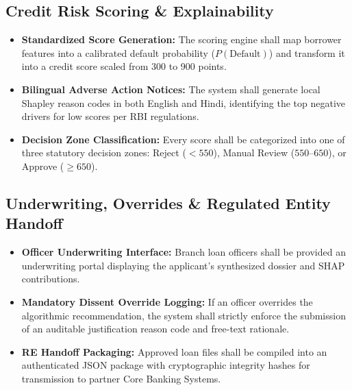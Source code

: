 \subsection{Credit Risk Scoring \& Explainability}
\begin{itemize}[leftmargin=2em, label=\textbf{FR-\arabic*.}]
  \setcounter{enumi}{6}
  \item \textbf{Standardized Score Generation:} The scoring engine shall map borrower features into a calibrated default probability ($P(\text{Default})$) and transform it into a credit score scaled from 300 to 900 points.
  \item \textbf{Bilingual Adverse Action Notices:} The system shall generate local Shapley reason codes in both English and Hindi, identifying the top negative drivers for low scores per RBI regulations.
  \item \textbf{Decision Zone Classification:} Every score shall be categorized into one of three statutory decision zones: Reject ($<550$), Manual Review ($550\text{--}650$), or Approve ($\ge 650$).
\end{itemize}

\subsection{Underwriting, Overrides \& Regulated Entity Handoff}
\begin{itemize}[leftmargin=2em, label=\textbf{FR-\arabic*.}]
  \setcounter{enumi}{9}
  \item \textbf{Officer Underwriting Interface:} Branch loan officers shall be provided an underwriting portal displaying the applicant's synthesized dossier and SHAP contributions.
  \item \textbf{Mandatory Dissent Override Logging:} If an officer overrides the algorithmic recommendation, the system shall strictly enforce the submission of an auditable justification reason code and free-text rationale.
  \item \textbf{RE Handoff Packaging:} Approved loan files shall be compiled into an authenticated JSON package with cryptographic integrity hashes for transmission to partner Core Banking Systems.
\end{itemize}


